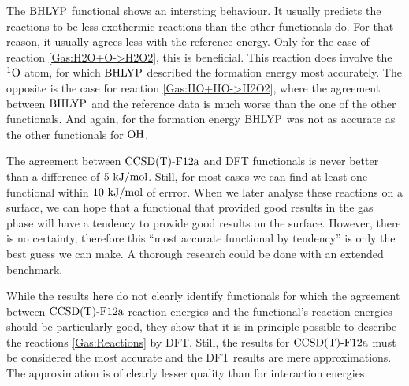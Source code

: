 \documentclass[8.5pt,twoside,twocolumn]{article}
\newcommand\singo{\enmat{{^1\te{O}}}}
\newcommand\tripot{\enmat{{^3\ot}}}
\newcommand\kmo{\enmat{\te {kJ/mol}}}
\theoremstyle{standard}
\begin{document}
The $\text{BHLYP}$ functional shows an intersting behaviour. It usually
predicts the reactions to be less exothermic reactions than the other
functionals do.
For that reason, it usually agrees less with the reference energy.
Only for the case of reaction \eqref{Gas:H2O+O->H2O2}, this is beneficial. This
reaction does involve the $\singo$ atom, for which $\text{BHLYP}$ described the
formation energy most accurately. The opposite is the case for reaction
\eqref{Gas:HO+HO->H2O2}, where the agreement between $\text{BHLYP}$ and the reference
data is much worse than the one of the other functionals. And again, for the
formation energy $\text{BHLYP}$ was not as accurate as the other functionals for
$\text O \text H$.

The agreement between $\text{CCSD(T)-F12a}$ and DFT functionals is never better than a
difference of $5~\kmo$. Still, for most cases we can find at least one
functional within $10~\kmo$ of errror. When we later analyse these reactions on
a surface, we can hope that a functional that provided good results in the
gas phase will have a tendency to provide good results on the surface. However,
there is no certainty, therefore this ``most accurate functional by tendency'' is
only the best guess we can make. A thorough research could be done with
an extended benchmark.

While the results here do not clearly identify functionals for which the
agreement between $\text{CCSD(T)-F12a}$ reaction energies and the functional's reaction
energies should be particularly good, they show that it is in
principle possible to describe the reactions \eqref{Gas:Reactions} by DFT.
Still, the results for $\text{CCSD(T)-F12a}$ must be considered the most accurate
and the DFT results are mere approximations. The approximation is of
clearly lesser quality than for interaction energies.
\end{document}
